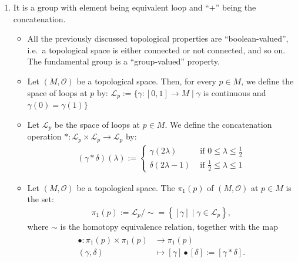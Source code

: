 \documentclass{article}
\begin{document}
\begin{enumerate}
\begin{figure}[h!]
\end{figure}
\item {} It is a group with element being equivalent loop and ``$+$'' being the concatenation.
\begin{itemize}
\item All the previously discussed topological properties are ``boolean-valued'', i.e.\ a topological space is either connected or not connected, and so on. The fundamental group is a ``group-valued'' property.
    \item {}  Let $(M, \mathcal{O})$ be a topological space. Then, for every $p \in M$, we define the space of loops at $p$ by:
$\mathscr{L}_{p}:=\{\gamma:[0,1] \rightarrow M \mid \gamma$ is continuous and $\gamma(0)=\gamma(1)\}$
\item {} Let $\mathscr{L}_{p}$ be the space of loops at $p \in M$. We define the concatenation operation $*: \mathscr{L}_{p} \times \mathscr{L}_{p} \rightarrow \mathscr{L}_{p}$ by:
\begin{align*}
(\gamma * \delta)(\lambda):= \begin{cases}\gamma(2 \lambda) & \text { if } 0 \leq \lambda \leq \frac{1}{2} \\ \delta(2 \lambda-1) & \text { if } \frac{1}{2} \leq \lambda \leq 1\end{cases}
\end{align*}
\item Let $(M, \mathcal{O})$ be a topological space. The  $\pi_{1}(p)$ of $(M, \mathcal{O})$ at $p \in M$ is the set:
\begin{align*}
\pi_{1}(p):=\mathscr{L}_{p} / \sim=\left\{[\gamma] \mid \gamma \in \mathscr{L}_{p}\right\},
\end{align*}
where $\sim$ is the homotopy equivalence relation, together with the map
\begin{align*}
\begin{aligned}
\bullet: \pi_{1}(p) \times \pi_{1}(p) & \rightarrow \pi_{1}(p) \\
(\gamma, \delta) & \mapsto[\gamma] \bullet[\delta]:=[\gamma * \delta] .

\end{aligned}
\end{align*}
\end{itemize}
\end{enumerate}
\end{document}
